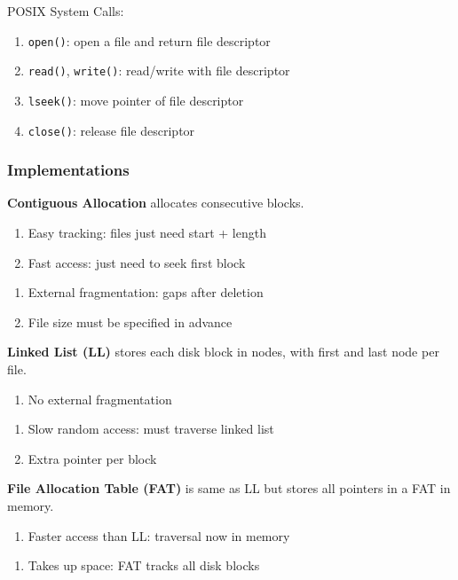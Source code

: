 \documentclass[12pt, a4paper]{article}
\begin{document}
\begin{multicols*}{3}
POSIX System Calls:
\begin{enumerate}[\roman*.]
  \item \lstinline|open()|: open a file and return file descriptor
  \item \lstinline|read()|, \lstinline|write()|: read/write with file descriptor
  \item \lstinline|lseek()|: move pointer of file descriptor
  \item \lstinline|close()|: release file descriptor
\end{enumerate}

\subsubsection{Implementations}

\textbf{Contiguous Allocation} allocates consecutive blocks. 
\begin{enumerate}[$+$]
  \item Easy tracking: files just need start + length
  \item Fast access: just need to seek first block
\end{enumerate}\vspace{-1pt}
\begin{enumerate}[$-$]
  \item External fragmentation: gaps after deletion
  \item File size must be specified in advance
\end{enumerate}

\textbf{Linked List (LL)} stores each disk block in nodes, with first and last node per file.
\begin{enumerate}[$+$]
  \item No external fragmentation
\end{enumerate}\vspace{-1pt}
\begin{enumerate}[$-$]
  \item Slow random access: must traverse linked list
  \item Extra pointer per block
\end{enumerate}

\textbf{File Allocation Table (FAT)} is same as LL but stores all pointers in a FAT in memory.
\begin{enumerate}[$+$]
  \item Faster access than LL: traversal now in memory
\end{enumerate}\vspace{-1pt}
\begin{enumerate}[$-$]
  \item Takes up space: FAT tracks all disk blocks
\end{enumerate}


\end{multicols*}
\end{document}
